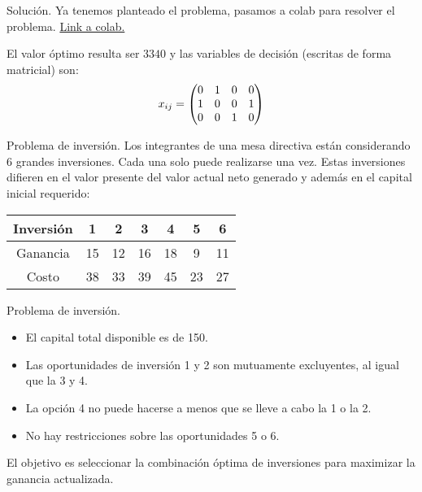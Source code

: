 \documentclass{beamer}
\begin{document}
\begin{frame}[fragile]{Solución.}
  Ya tenemos planteado el problema, pasamos a colab para resolver el problema.
  \href{https://colab.research.google.com/drive/1cPl8BasMrIC50dWZhoVIsz7EAYtN1h3w?usp=sharing}{Link a colab.}

  \pause 
  \bigskip 

  El valor óptimo resulta ser $3340$ y las variables de decisión (escritas de forma matricial) son: 
  \[
    x_{ij} = \begin{pmatrix}0 & 1 & 0 & 0 \\ 1 & 0 & 0 & 1 \\ 0 & 0 & 1 & 0\end{pmatrix}
  \]

\end{frame}


\begin{frame}[fragile]{Problema de inversión.}
  Los integrantes de una mesa directiva están considerando 6 grandes inversiones. Cada una solo puede realizarse una vez. 
  Estas inversiones difieren en el valor presente del valor actual neto generado y además en el capital inicial requerido: 
  \bigskip 
  \begin{center}
    \begin{adjustbox}{width = 0.65 \textwidth}
      \begin{tabular}{|c |c | c | c| c| c | c|}
        \hline
        Inversión & 1 & 2 & 3 & 4 & 5 & 6 \\
        \hline 
        Ganancia & 15  & 12  & 16  & 18 & 9  & 11  \\
        Costo    & 38  & 33  & 39  & 45 & 23 & 27  \\
        \hline 
      \end{tabular}
    \end{adjustbox}
  \end{center}
\end{frame}

\begin{frame}[fragile]{Problema de inversión.}

  \begin{itemize}
    \item El capital total disponible es de 150.
    \item Las oportunidades de inversión 1 y 2 son mutuamente excluyentes, al igual que la 3 y 4. 
    \item La opción 4 no puede hacerse a menos que se lleve a cabo la 1 o la 2.
    \item No hay restricciones sobre las oportunidades 5 o 6.
  \end{itemize}

  \bigskip 
  \pause 

  El objetivo es seleccionar la combinación óptima de inversiones para maximizar la ganancia actualizada.
\end{frame}
\end{document}
